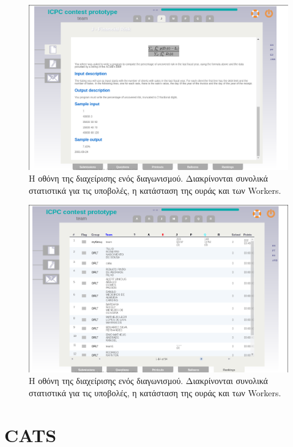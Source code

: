 \documentclass[diploma]{softlab-thesis}
\begin{document}
\begin{figure}
  \centering
  \includegraphics[scale=0.3]{Figures/mooshakproblem.png}
  \caption[Οθόνη διαχείρισης προβλήματος]{Η οθόνη της διαχείρισης ενός διαγωνισμού.
  Διακρίνονται συνολικά στατιστικά για τις υποβολές, η κατάσταση της ουράς και των
  Workers.}
\end{figure}

\begin{figure}
  \centering
  \includegraphics[scale=0.3]{Figures/mooshakrankings.png}
  \caption[Οθόνη διαχείρισης προβλήματος]{Η οθόνη της διαχείρισης ενός διαγωνισμού.
  Διακρίνονται συνολικά στατιστικά για τις υποβολές, η κατάσταση της ουράς και των
  Workers.}
\end{figure}

\FloatBarrier

\section{CATS}
\end{document}
